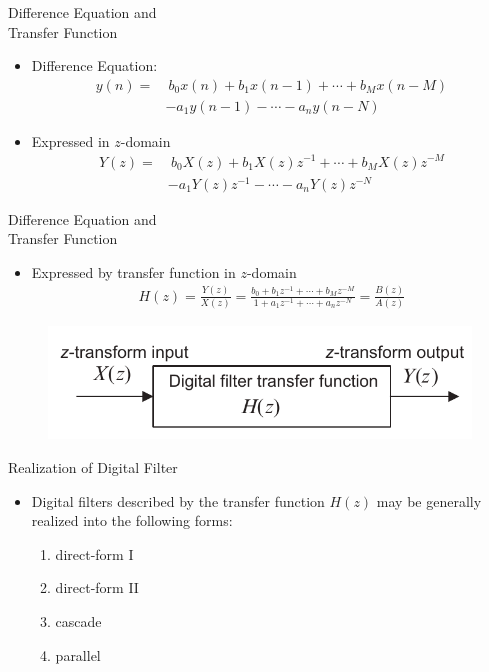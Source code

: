 \documentclass[pdflatex,compress,mathserif]{beamer}
\begin{document}
\begin{frame}{Difference Equation and\\Transfer Function}
	\begin{itemize}
		\item Difference Equation:
		\begin{align*}
			y(n) = &~ b_0 x(n) + b_1 x(n-1) + \cdots +b_Mx(n-M)\\
				   & -a_1y(n-1) - \cdots - a_ny(n-N)
		\end{align*}
		\item Expressed in $z$-domain
		\begin{align*}
			Y(z) = &~ b_0 X(z) + b_1 X(z)z^{-1} + \cdots + b_M X(z)z^{-M}\\
				   & -a_1Y(z)z^{-1} - \cdots - a_n Y(z)z^{-N}
		\end{align*}
	\end{itemize}
\end{frame}

\begin{frame}{Difference Equation and\\Transfer Function}
	\begin{itemize}
		\item Expressed by transfer function in $z$-domain
		\begin{align*}
			H(z) = \frac{Y(z)}{X(z)} = \frac{b_0 + b_1z^{-1} + \cdots + b_M z^{-M}}{1 + a_1z^{-1} + \cdots + a_n z^{-N}} = \frac{B(z)}{A(z)}
		\end{align*}
	\end{itemize}
	\begin{figure}
		\includegraphics[width=0.7\linewidth]{./img/img02.png}
	\end{figure}
\end{frame}

\begin{frame}{Realization of Digital Filter}
	\begin{itemize}
		\item Digital filters described by the transfer function $H(z)$ may be generally realized into the following forms:
		\begin{enumerate}
			\item direct-form I
			\item direct-form II
			\item cascade
			\item parallel
		\end{enumerate}
	\end{itemize}
\end{frame}
\end{document}
